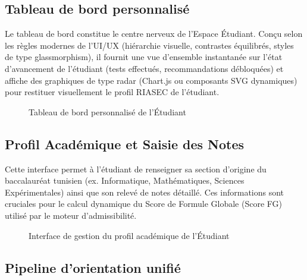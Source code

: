 \subsection{Tableau de bord personnalisé}

Le tableau de bord constitue le centre nerveux de l'Espace Étudiant. Conçu selon les règles modernes de l'UI/UX (hiérarchie visuelle, contrastes équilibrés, styles de type glassmorphism), il fournit une vue d'ensemble instantanée sur l'état d'avancement de l'étudiant (tests effectués, recommandations débloquées) et affiche des graphiques de type radar (Chart.js ou composants SVG dynamiques) pour restituer visuellement le profil RIASEC de l'étudiant.

\begin{figure}[H]
    \centering
    \caption{Tableau de bord personnalisé de l'Étudiant}
    \label{fig:interface_dashboard_etudiant}
\end{figure}

\subsection{Profil Académique et Saisie des Notes}

Cette interface permet à l'étudiant de renseigner sa section d'origine du baccalauréat tunisien (ex. Informatique, Mathématiques, Sciences Expérimentales) ainsi que son relevé de notes détaillé. Ces informations sont cruciales pour le calcul dynamique du Score de Formule Globale (Score FG) utilisé par le moteur d'admissibilité.

\begin{figure}[H]
    \centering
    \caption{Interface de gestion du profil académique de l'Étudiant}
    \label{fig:interface_profil_academique}
\end{figure}

\subsection{Pipeline d'orientation unifié}

